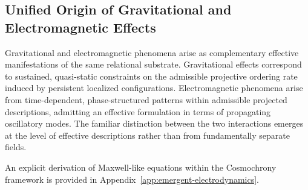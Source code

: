 \subsection{Unified Origin of Gravitational and Electromagnetic Effects}
  \label{subsec:unified-origin-of-gravitational-and-electromagnetic-effects}

  Gravitational and electromagnetic phenomena arise as complementary
  effective manifestations of the same relational substrate.
  Gravitational effects correspond to sustained, quasi-static constraints
  on the admissible projective ordering rate induced by persistent localized
  configurations.
  Electromagnetic phenomena arise from time-dependent, phase-structured
  patterns within admissible projected descriptions, admitting an effective
  formulation in terms of propagating oscillatory modes.
  The familiar distinction between the two interactions emerges at the level
  of effective descriptions rather than from fundamentally separate fields.

  An explicit derivation of Maxwell-like equations within the Cosmochrony
  framework is provided in
  Appendix~\ref{app:emergent-electrodynamics}.
